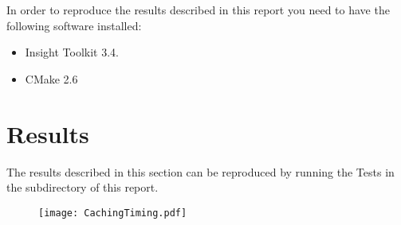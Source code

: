 \documentclass{InsightArticle}
\begin{document}
In order to reproduce the results described in this report you need to have the
following software installed:

\begin{itemize}
  \item  Insight Toolkit 3.4.
  \item  CMake 2.6
\end{itemize}


\appendix

\section{Results}

The results described in this section can be reproduced by running the Tests in
the  subdirectory of this report.

\begin{figure}[ht]
\centering
\texttt{[image: CachingTiming.pdf]}
\end{figure}


\end{document}
